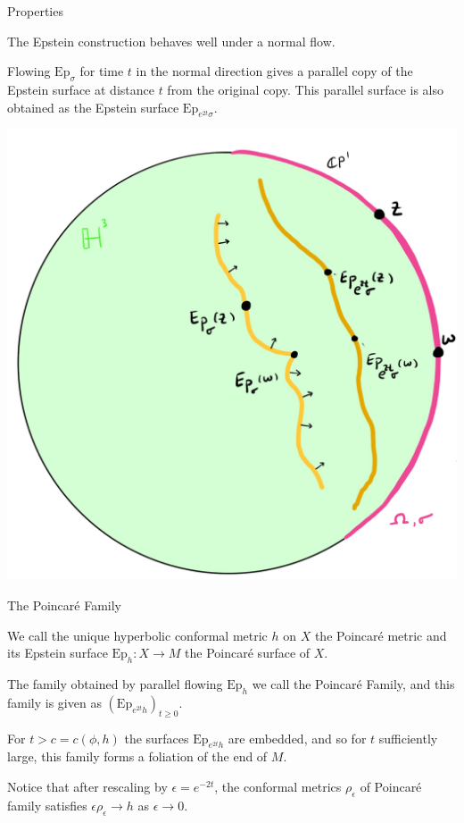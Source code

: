 \documentclass[professionalfont]{beamer}
\begin{document}
\begin{frame}{Properties}

The Epstein construction behaves well under a normal flow. 

Flowing $\mathrm{Ep}_\sigma$ for time $t$ in the normal direction gives a parallel copy of the Epstein surface at distance $t$ from the original copy. This parallel surface is also obtained as the Epstein surface $\mathrm{Ep}_{e^{2t}\sigma}$.

\centering\includegraphics[scale=0.09]{Parallel-11.jpg}

\end{frame}




\begin{frame}{The Poincar\'e Family}



We call the unique hyperbolic conformal metric $h$ on $X$ the Poincar\'e metric and its Epstein surface $\mathrm{Ep}_h: X \to M$ the Poincar\'e surface of $X$. 
\newline \pause

The family obtained by parallel flowing $\mathrm{Ep}_h$ we call the Poincar\'e Family, and this family is given as $(\mathrm{Ep}_{e^{2t}h})_{t\geq 0}$.
\newline \pause

For $t > c = c(\phi, h)$ the surfaces $\mathrm{Ep}_{e^{2t}h}$ are embedded, and so for $t$ sufficiently large, this family forms a foliation of the end of $M$.
\newline \pause

Notice that after rescaling by $\epsilon = e^{-2t}$, the conformal metrics $\rho_\epsilon$ of Poincar\'e family satisfies $\epsilon \rho_\epsilon \to h$ as $\epsilon \to 0$.


\end{frame}
\end{document}
